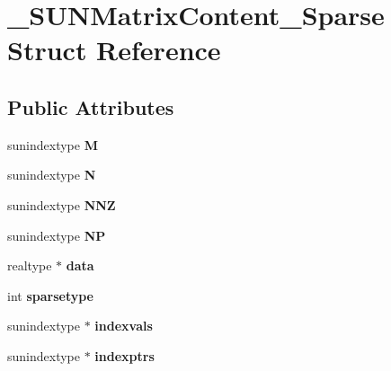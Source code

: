\hypertarget{struct__SUNMatrixContent__Sparse}{}\section{\+\_\+\+S\+U\+N\+Matrix\+Content\+\_\+\+Sparse Struct Reference}
\label{struct__SUNMatrixContent__Sparse}
\subsection*{Public Attributes}
\begin{DoxyCompactItemize}
\item 
\mbox{\label{struct__SUNMatrixContent__Sparse_a86b6ef7a54604eb9b5c1302036604591}} 
sunindextype {\bfseries M}
\item 
\mbox{\label{struct__SUNMatrixContent__Sparse_a345190baf0a2fd9c948a2128a8c67785}} 
sunindextype {\bfseries N}
\item 
\mbox{\label{struct__SUNMatrixContent__Sparse_a6e3cdb6cbe3c4114d7ac9eb59910be74}} 
sunindextype {\bfseries N\+NZ}
\item 
\mbox{\label{struct__SUNMatrixContent__Sparse_a0b1cdca303c026dc942d9276af36a091}} 
sunindextype {\bfseries NP}
\item 
\mbox{\label{struct__SUNMatrixContent__Sparse_a87f96bf4a97bcd4cfa6904ea2840b802}} 
realtype $\ast$ {\bfseries data}
\item 
\mbox{\label{struct__SUNMatrixContent__Sparse_a85a11622207f75d11f61083591220820}} 
int {\bfseries sparsetype}
\item 
\mbox{\label{struct__SUNMatrixContent__Sparse_aee85df9b7e78cc970c6e39a853fe2b86}} 
sunindextype $\ast$ {\bfseries indexvals}
\item 
\mbox{\label{struct__SUNMatrixContent__Sparse_a486d7eb0b98af1056f403a5aacc936a1}} 
sunindextype $\ast$ {\bfseries indexptrs}

\end{DoxyCompactItemize}
